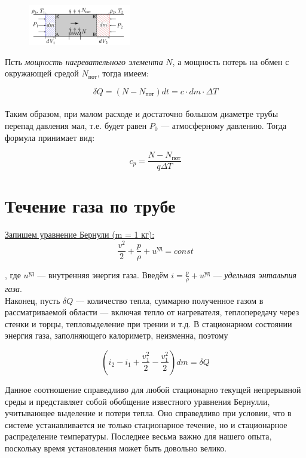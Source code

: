 \documentclass[a4paper,12pt]{article}
\begin{document}
        \begin{figure} %
            \centering
            \includegraphics[width=0.4\textwidth]{211kal.png} %
        \end{figure}

        Псть \textit{мощность нагревательного элемента} \(N\), а мощность потерь на обмен с окружающей средой \(N_{\text{пот}}\), тогда имеем:

        \[\delta Q = (N - N_{\text{пот}})dt = c \cdot dm \cdot \Delta T\] \\

        Таким образом, при малом расходе и достаточно большом диаметре трубы перепад давления мал, т.е. будет равен \(P_{0}\) --- атмосферному давлению. Тогда формула принимает вид:

        \[c_p = \frac{N - N_{\text{пот}}}{q\Delta T}\]

        \section{Течение газа по трубе}

        \underline{Запишем уравнение Бернули (m = 1 кг):} 
        \[\frac{v^2}{2} + \frac{p}{\rho} + u^{\text{уд}} = const\]

        , где \(u^{\text{уд}}\) --- внутренняя энергия газа. Введём \(i = \frac{p}{\rho} + u^{\text{уд}}\) --- \textit{удельная энтальпия газа}.\\

        Наконец, пусть \(\delta Q\) — количество тепла, суммарно полученное газом в рассматриваемой области — включая тепло от нагревателя, теплопередачу через стенки и торцы, тепловыделение при трении и т.д. В стационарном состоянии энергия газа, заполняющего калориметр, неизменна, поэтому

        \[\left(i_2 - i_1 + \frac{v^2_{1}}{2} - \frac{v^2_{1}}{2} \right)dm = \delta Q \]

        Данное cоотношение справедливо для любой стационарно текущей непрерывной среды и представляет собой обобщение известного уравнения Бернулли,
        учитывающее выделение и потери тепла. Оно справедливо при условии, что
        в системе устанавливается не только стационарное течение, но и стационарное распределение температуры. Последнее весьма важно для нашего опыта,
        поскольку время установления может быть довольно велико.
\end{document}
